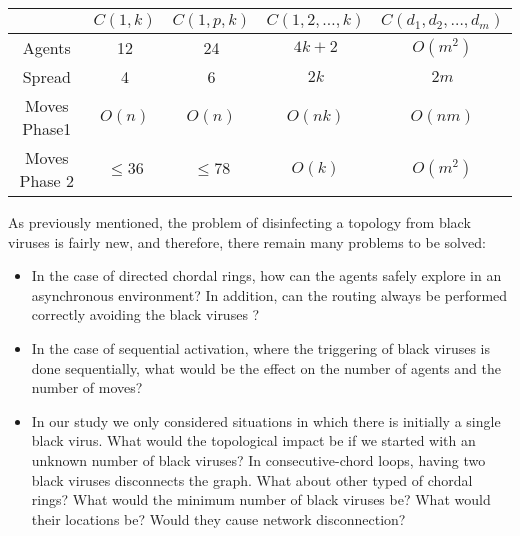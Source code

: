 \begin{center}
\begin{tabular}{|c|c|c|c|c|}\hline
        &{\bf $C(1,  k)$} &{\bf $C(1, p, k)$} & {\bf $C(1,2,\ldots,k)$}& {\bf $C(d_1,d_2,\ldots,d_m)$}
\\ \hline 
Agents & 12  & 24 & $4k+2$ &   $O(m^2)$  \\\hline
Spread & 4   & 6 &  $2k$ & $2m$  \\\hline
Moves Phase1 &$O(n)$ & $O(n)$ &  $O(nk) $ &  $O(nm) $  \\\hline
Moves Phase 2 & $\leq 36$   &     $\leq 78$  &  $O(k)$& $O(m^2)$ 
 \\\hline
\end{tabular}
\end{center}




As  previously mentioned, the problem of disinfecting a topology from black viruses is fairly new, and therefore, there remain many problems to be solved:
\begin{itemize}
\item In the case of   directed chordal rings, how can  the agents safely explore   in an asynchronous environment? In addition,  can  the routing always be performed correctly avoiding the black viruses ?
\item In the case of  sequential activation, where the triggering of black viruses is done sequentially, what would be the effect on the number of agents and the number of moves?

\item In our study we only considered situations in which there is initially a single black virus. What would the topological impact be if we started with an unknown number of black viruses? In consecutive-chord loops, having two black viruses disconnects the graph. What about other typed of chordal rings? What would the minimum number of black viruses be? What would their locations be? Would they cause network disconnection?

\end{itemize}













